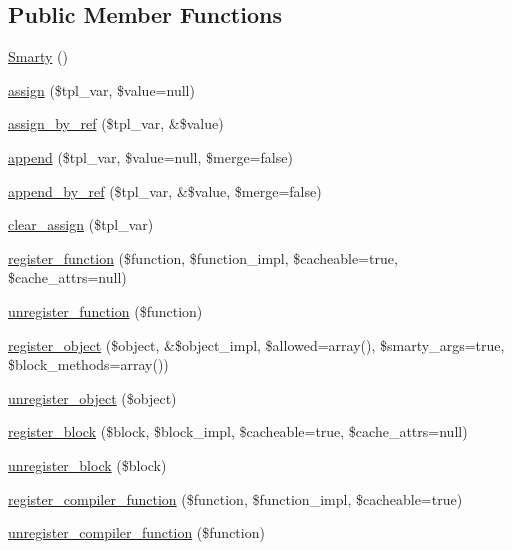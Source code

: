 \subsection*{Public Member Functions}
\begin{DoxyCompactItemize}
\item 
\mbox{\hyperlink{class_smarty_a95e66b59b996781de0a0b95c83f1a5a7}{Smarty}} ()
\item 
\mbox{\hyperlink{class_smarty_a12150893d5c5bab121e248f450e727fa}{assign}} (\$tpl\+\_\+var, \$value=null)
\item 
\mbox{\hyperlink{class_smarty_aebc96e36370712d0c9e5896db76bd487}{assign\+\_\+by\+\_\+ref}} (\$tpl\+\_\+var, \&\$value)
\item 
\mbox{\hyperlink{class_smarty_a9870a97b08f66d2c1b19f3e54770cb29}{append}} (\$tpl\+\_\+var, \$value=null, \$merge=false)
\item 
\mbox{\hyperlink{class_smarty_a1a744cb1e3d6473ddcd531412c54f07e}{append\+\_\+by\+\_\+ref}} (\$tpl\+\_\+var, \&\$value, \$merge=false)
\item 
\mbox{\hyperlink{class_smarty_ad0188dcb261ac235ac70c141f2e6657e}{clear\+\_\+assign}} (\$tpl\+\_\+var)
\item 
\mbox{\hyperlink{class_smarty_aa933e1e9fb0b13f22101de4acbaf699c}{register\+\_\+function}} (\$function, \$function\+\_\+impl, \$cacheable=true, \$cache\+\_\+attrs=null)
\item 
\mbox{\hyperlink{class_smarty_ae73d72302d6bcf8a0b284654b2ecef15}{unregister\+\_\+function}} (\$function)
\item 
\mbox{\hyperlink{class_smarty_ad3e5b167a6483dbd669a736ee0000b9a}{register\+\_\+object}} (\$object, \&\$object\+\_\+impl, \$allowed=array(), \$smarty\+\_\+args=true, \$block\+\_\+methods=array())
\item 
\mbox{\hyperlink{class_smarty_a49288d1943e174bcb8e924a4b449d050}{unregister\+\_\+object}} (\$object)
\item 
\mbox{\hyperlink{class_smarty_a2a6564c20eaeecdddd192885f9d5a794}{register\+\_\+block}} (\$block, \$block\+\_\+impl, \$cacheable=true, \$cache\+\_\+attrs=null)
\item 
\mbox{\hyperlink{class_smarty_aa27d55eff4bc63b71da604fb1af362c9}{unregister\+\_\+block}} (\$block)
\item 
\mbox{\hyperlink{class_smarty_a4b141e0b9a699098e8986aca16e871ca}{register\+\_\+compiler\+\_\+function}} (\$function, \$function\+\_\+impl, \$cacheable=true)
\item 
\mbox{\hyperlink{class_smarty_a85920043d6bf2ee895a1dc3fa2c464ca}{unregister\+\_\+compiler\+\_\+function}} (\$function)

\end{DoxyCompactItemize}
